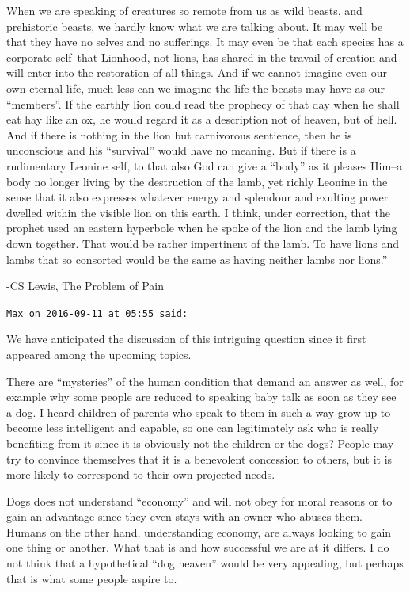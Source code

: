 \begin{footnotesize}
\begin{sffamily}
When we are speaking of creatures so remote from us as wild beasts, and prehistoric beasts, we hardly know what we are talking about. It may well be that they have no selves and no sufferings. It may even be that each species has a corporate self–that Lionhood, not lions, has shared in the travail of creation and will enter into the restoration of all things. And if we cannot imagine even our own eternal life, much less can we imagine the life the beasts may have as our “members”. If the earthly lion could read the prophecy of that day when he shall eat hay like an ox, he would regard it as a description not of heaven, but of hell. And if there is nothing in the lion but carnivorous sentience, then he is unconscious and his “survival” would have no meaning. But if there is a rudimentary Leonine self, to that also God can give a “body” as it pleases Him–a body no longer living by the destruction of the lamb, yet richly Leonine in the sense that it also expresses whatever energy and splendour and exulting power dwelled within the visible lion on this earth. I think, under correction, that the prophet used an eastern hyperbole when he spoke of the lion and the lamb lying down together. That would be rather impertinent of the lamb. To have lions and lambs that so consorted would be the same as having neither lambs nor lions.”

{}-CS Lewis, The Problem of Pain


\hfill

\texttt{Max on 2016-09-11 at 05:55 said: }

We have anticipated the discussion of this intriguing question since it first appeared among the upcoming topics.

There are “mysteries” of the human condition that demand an answer as well, for example why some people are reduced to speaking baby talk as soon as they see a dog. I heard children of parents who speak to them in such a way grow up to become less intelligent and capable, so one can legitimately ask who is really benefiting from it since it is obviously not the children or the dogs? People may try to convince themselves that it is a benevolent concession to others, but it is more likely to correspond to their own projected needs.

Dogs does not understand “economy” and will not obey for moral reasons or to gain an advantage since they even stays with an owner who abuses them. Humans on the other hand, understanding economy, are always looking to gain one thing or another. What that is and how successful we are at it differs. I do not think that a hypothetical “dog heaven” would be very appealing, but perhaps that is what some people aspire to.


\end{sffamily}
\end{footnotesize}
